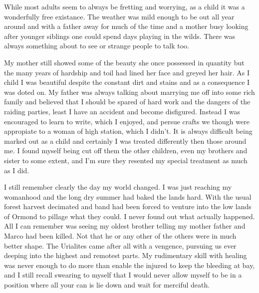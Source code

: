\documentclass{article}
\begin{document}
While most adults seem to always be fretting and worrying, as a child
it was a wonderfully free existance.  The weather was mild enough to
be out all year around and with a father away for much of the time and
a mother busy looking after younger siblings one could spend days
playing in the wilds.  There was always something about to see or
strange people to talk too.

My mother still showed some of the beauty she once possessed in
quantity but the many years of hardship and toil had lined her face
and greyed her hair.  As I child I was beautiful despite the constant
dirt and stains and as a consequence I was doted on.  My father was
always talking about marrying me off into some rich family and
believed that I should be spared of hard work and the dangers of the
raiding parties, least I have an accident and become disfigured.
Instead I was encouraged to learn to write, which I enjoyed, and
persue crafts we though were appropiate to a woman of high station,
which I didn't.  It is always difficult being marked out as a child
and certainly I was treated differently then those around me.  I
found myself being cut off them the other children, even my brothers
and sister to some extent, and I'm sure they resented my special
treatment as much as I did.

I still remember clearly the day my world changed.  I was just
reaching my womanhood and the long dry summer had baked the lands
hard.  With the usual forest harvest decimated and band had been
forced to venture into the low lands of Ormond to pillage what they
could.  I never found out what actually happened. All I can remember
was seeing my oldest brother telling my mother father and Marco had
been killed.  Not that he or any other of the others were in much
better shape. The Urialites came after all with a vengence, pursuing
us ever deeping into the highest and remotest parts. My rudimentary
skill with healing was never enough to do more than enable the injured
to keep the bleeding at bay, and I still recall swearing to myself
that I would never allow myself to be in a position where all your can
is lie down and wait for merciful death.
\end{document}
